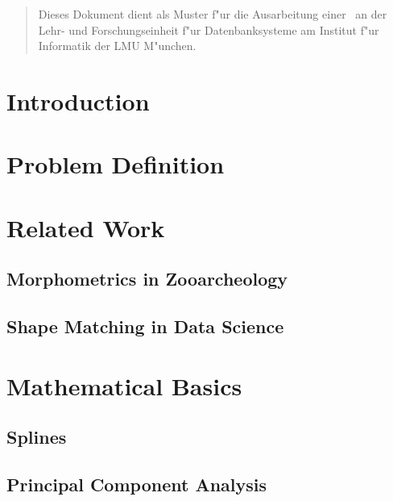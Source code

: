 \documentclass[pdftex,12pt,a4paper]{report}
\begin{document}
\deckblatt

\erklaerung

\begin{abstract}
Dieses Dokument dient als Muster f"ur die Ausarbeitung einer \the\arbeit\
an der Lehr- und Forschungseinheit f"ur Datenbanksysteme am Institut f"ur
Informatik der LMU M"unchen.
\end{abstract}

\tableofcontents

\chapter{Introduction}

\chapter{Problem Definition}

\chapter{Related Work}

\section{Morphometrics in Zooarcheology}

\cite{blackith1971multivariate}
\cite{adams2004geometric}
\cite{mitteroecker2009advances}

\section{Shape Matching in Data Science}

\cite{da2010shape}
\cite{veltkamp2001shape}
\cite{belongie2002shape}
\cite{mhamdi2014local}

\chapter{Mathematical Basics}

\section{Splines}
\label{section:splines}

\section{Principal Component Analysis}
\end{document}
